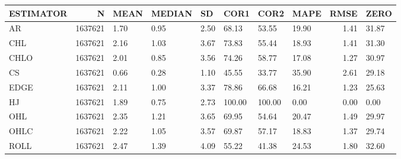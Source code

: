 \begin{table}[ht]
\centering
\begin{tabular}{lrllllllrl}
  \hline
ESTIMATOR & N & MEAN & MEDIAN & SD & COR1 & COR2 & MAPE & RMSE & ZERO \\ 
  \hline
AR & 1637621 & 1.70 & 0.95 & 2.50 & 68.13 & 53.55 & 19.90 & 1.41 & 31.87 \\ 
  CHL & 1637621 & 2.16 & 1.03 & 3.67 & 73.83 & 55.44 & 18.93 & 1.41 & 31.30 \\ 
  CHLO & 1637621 & 2.01 & 0.85 & 3.56 & 74.26 & 58.77 & 17.08 & 1.27 & 30.97 \\ 
  CS & 1637621 & 0.66 & 0.28 & 1.10 & 45.55 & 33.77 & 35.90 & 2.61 & 29.18 \\ 
  EDGE & 1637621 & 2.11 & 1.00 & 3.37 & 78.86 & 66.68 & 16.21 & 1.23 & 25.63 \\ 
  HJ & 1637621 & 1.89 & 0.75 & 2.73 & 100.00 & 100.00 & 0.00 & 0.00 & 0.00 \\ 
  OHL & 1637621 & 2.35 & 1.21 & 3.65 & 69.95 & 54.64 & 20.47 & 1.49 & 29.97 \\ 
  OHLC & 1637621 & 2.22 & 1.05 & 3.57 & 69.87 & 57.17 & 18.83 & 1.37 & 29.74 \\ 
  ROLL & 1637621 & 2.47 & 1.39 & 4.09 & 55.22 & 41.38 & 24.53 & 1.80 & 32.60 \\ 
   \hline
\end{tabular}
\end{table}

